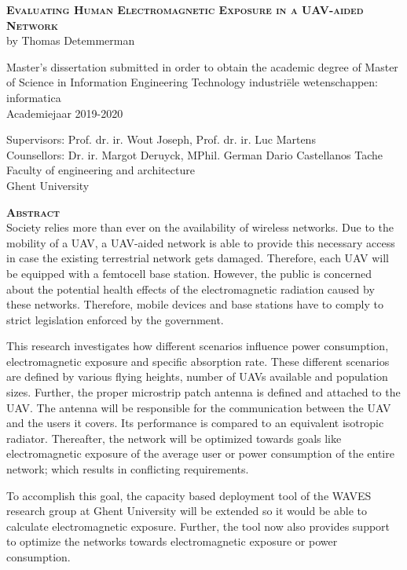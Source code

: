 \begin{center}
\textsc{\textbf{\Huge Evaluating Human Electromagnetic Exposure in a UAV-aided Network}}\\
by Thomas Detemmerman

Master's dissertation submitted in order to obtain the academic degree of Master of Science in Information Engineering Technology
industri\"ele wetenschappen: informatica\\
Academiejaar 2019-2020

Supervisors: Prof. dr. ir. Wout Joseph, Prof. dr. ir. Luc Martens\\
Counsellors: Dr. ir. Margot Deruyck, MPhil. German Dario Castellanos Tache\\
Faculty of engineering and architecture\\
Ghent University
\end{center}
\textsc{\textbf{\LARGE Abstract}}\\
Society relies more than ever on the availability of wireless networks.
Due to the mobility of a UAV, a UAV-aided network is able to provide this necessary access in case the existing terrestrial network gets damaged.
Therefore, each UAV will be equipped with a femtocell base station.
However,  the public is 
concerned about the potential health effects of the electromagnetic radiation caused by these networks.
Therefore, mobile devices and base stations have to comply to strict legislation enforced by the government.

This research investigates how different scenarios influence power consumption, electromagnetic exposure and specific absorption rate.
These different scenarios are defined by various flying heights, number of UAVs available and population sizes. Further, 
the proper microstrip patch antenna is defined and attached to the UAV. 
The antenna will be responsible for the communication between the UAV and the users it covers.
Its performance is compared to  
an equivalent isotropic radiator.
Thereafter, the network will be optimized towards goals like electromagnetic exposure of the average user or 
power consumption of the entire network; which results in conflicting requirements.

To accomplish this goal, the capacity based deployment tool of the WAVES research group at Ghent University
will be extended so it would be able to calculate electromagnetic exposure.
Further, the tool now also provides support to optimize the networks towards electromagnetic exposure or power consumption.

